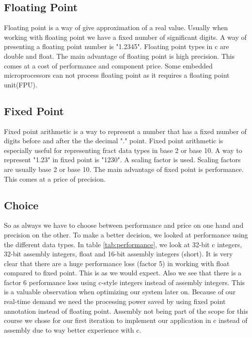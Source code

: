\subsection{Floating Point}
Floating point is a way of give approximation of a real value. Usually when working with floating point we have a fixed number of significant digits. A way of presenting a floating point number is "1.2345". Floating point types in c are double and float. The main advantage of floating point is high precision. This comes at a cost of performance and component price. Some embedded microprocessors can not process floating point as it requires a floating point unit(FPU).\\
\subsection{Fixed Point}
Fixed point arithmetic is a way to represent a number that has a fixed number of digits before and after the the decimal "." point. Fixed point arithmetic is especially useful for representing fract data types in base 2 or base 10. A way to represent "1.23" in fixed point is "1230". A scaling factor is used. Scaling factors are usually base 2 or base 10. The main advantage of fixed point is performance. This comes at a price of precision.\\
\subsection{Choice}
So as always we have to choose between performance and price on one hand and precision on the other. To make a better decision, we looked at performance using the different data types. In table \ref{tab:performance}, we look at 32-bit c integers, 32-bit assembly integers, float and 16-bit assembly integers (short). It is very clear that there are a huge performance loss (factor 5) in working with float compared to fixed point. This is as we would expect. Also we see that there is a factor 6 performance loss using c-style integers instead of assembly integers. This is a valuable observation when optimizing our system later on.
Because of our real-time demand we need the processing power saved by using fixed point annotation instead of floating point. Assembly not being part of the scope for this course we chose for our first iteration to implement our application in c instead of assembly due to way better experience with c.

